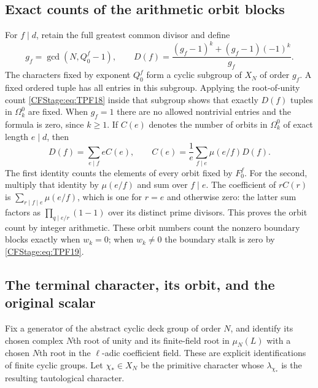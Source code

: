 \subsection{Exact counts of the arithmetic orbit blocks}

For \(f\mid d\), retain the full greatest common
divisor and define
\[
 g_f=\gcd(N,Q_0^f-1),\qquad
 D(f)=\frac{(g_f-1)^k+(g_f-1)(-1)^k}{g_f}.
 \tag{TPF.34}\label{CFStage:eq:TPF34}
\]
The characters fixed by exponent \(Q_0^f\)
form a cyclic subgroup of \(X_N\) of order
\(g_f\). A fixed ordered tuple has all
entries in this subgroup. Applying the
root-of-unity count \eqref{CFStage:eq:TPF18}
inside that subgroup shows that exactly
\(D(f)\) tuples in \(\Omega_k^0\) are fixed.
When \(g_f=1\) there are no allowed
nontrivial entries and the formula is
zero, since \(k\ge1\).
If \(C(e)\) denotes the number of orbits
in \(\Omega_k^0\) of exact length \(e\mid d\), then
\[
 D(f)=\sum_{e\mid f}eC(e),\qquad
 C(e)=\frac1e\sum_{f\mid e}\mu(e/f)D(f).
 \tag{TPF.35}\label{CFStage:eq:TPF35}
\]
The first identity counts the elements
of every orbit fixed by \(F_0^f\).
For the second, multiply that identity
by \(\mu(e/f)\) and sum over \(f\mid e\).
The coefficient of \(rC(r)\) is
\(\sum_{r\mid f\mid e}\mu(e/f)\), which
is one for \(r=e\) and otherwise zero:
the latter sum factors as
\(\prod_{q\mid e/r}(1-1)\) over its
distinct prime divisors. This proves
the orbit count by integer arithmetic.
These orbit numbers count the nonzero boundary
blocks exactly when \(w_k=0\); when \(w_k\ne0\)
the boundary stalk is zero by \eqref{CFStage:eq:TPF19}.

\subsection{The terminal character, its orbit, and the original scalar}

Fix a generator of the abstract cyclic deck group of
order \(N\), and identify its chosen complex \(N\)th
root of unity and its finite-field root in \(\mu_N(L)\)
with a chosen \(N\)th root in the \(\ell\)-adic coefficient
field. These are explicit identifications of finite
cyclic groups. Let \(\chi_*\in X_N\) be the primitive
character whose \(\lambda_{\chi_*}\) is the resulting
tautological character.


